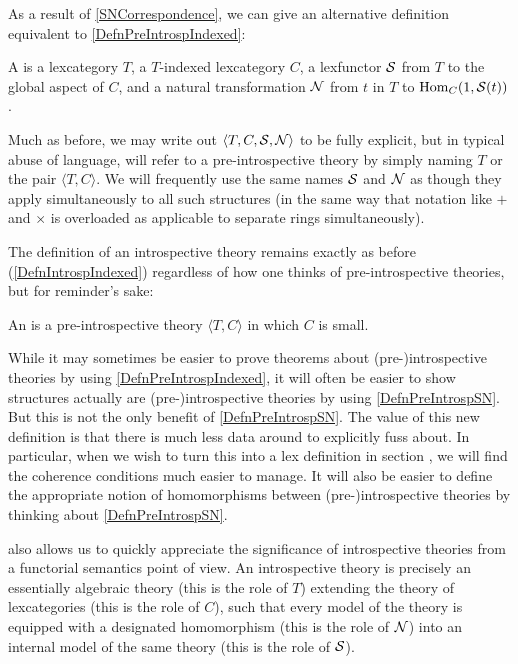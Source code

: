 As a result of \cref{SNCorrespondence}, we can give an alternative definition equivalent to \cref{DefnPreIntrospIndexed}:

\begin{definition}\label{DefnPreIntrospSN}
A  is a lexcategory $T$, a $T$-indexed lexcategory $C$, a lexfunctor $\mathcal{S}$ from $T$ to the global aspect of $C$, and a natural transformation $\mathcal{N}$ from $t$ in $T$ to $\operatorname{Hom}_C(1, \mathcal{S}(t))$.
\end{definition}

Much as before, we may write out $\langle T, C, \mathcal{S}, \mathcal{N} \rangle$ to be fully explicit, but in typical abuse of language, will refer to a pre-introspective theory by simply naming $T$ or the pair $\langle T, C\rangle$. We will frequently use the same names $\mathcal{S}$ and $\mathcal{N}$ as though they apply simultaneously to all such structures (in the same way that notation like $+$ and $\times$ is overloaded as applicable to separate rings simultaneously).

The definition of an introspective theory remains exactly as before (\cref{DefnIntrospIndexed}) regardless of how one thinks of pre-introspective theories, but for reminder's sake:

\begin{definition} \label{DefnIntrospSN}
An  is a pre-introspective theory $\langle T, C \rangle$ in which $C$ is small.
\end{definition}

While it may sometimes be easier to prove theorems about (pre-)introspective theories by using \cref{DefnPreIntrospIndexed}, it will often be easier to show structures actually are (pre-)introspective theories by using \cref{DefnPreIntrospSN}. But this is not the only benefit of \cref{DefnPreIntrospSN}. The value of this new definition is that there is much less data around to explicitly fuss about. In particular, when we wish to turn this into a lex definition in section \TODO, we will find the coherence conditions much easier to manage. It will also be easier to define the appropriate notion of homomorphisms between (pre-)introspective theories by thinking about \cref{DefnPreIntrospSN}.

 also allows us to quickly appreciate the significance of introspective theories from a functorial semantics point of view. An introspective theory is precisely an essentially algebraic theory (this is the role of $T$) extending the theory of lexcategories (this is the role of $C$), such that every model of the theory is equipped with a designated homomorphism (this is the role of $\mathcal{N}$) into an internal model of the same theory (this is the role of $\mathcal{S}$).

